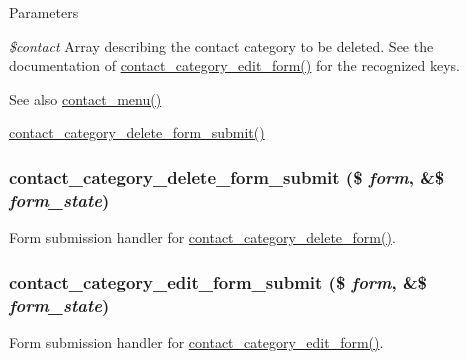 \begin{DoxyParams}{Parameters}
\item[{\em \$contact}]Array describing the contact category to be deleted. See the documentation of \hyperlink{group__forms_ga9283549b12df4a9a6cdb49202ae658ac}{contact\_\-category\_\-edit\_\-form()} for the recognized keys.\end{DoxyParams}
\begin{DoxySeeAlso}{See also}
\hyperlink{contact_8module_aa553b7cf1c3901cce1c2a8c4a04c5212}{contact\_\-menu()} 

\hyperlink{contact_8admin_8inc_a970b9c33770826b0f0229ffc42c0e277}{contact\_\-category\_\-delete\_\-form\_\-submit()} 
\end{DoxySeeAlso}
\hypertarget{contact_8admin_8inc_a970b9c33770826b0f0229ffc42c0e277}{
\subsubsection[{contact\_\-category\_\-delete\_\-form\_\-submit}]{\setlength{\rightskip}{0pt plus 5cm}contact\_\-category\_\-delete\_\-form\_\-submit (\$ {\em form}, \/  \&\$ {\em form\_\-state})}}
\label{contact_8admin_8inc_a970b9c33770826b0f0229ffc42c0e277}
Form submission handler for \hyperlink{contact_8admin_8inc_a33918ea271cb307b297673f8ea1eaf58}{contact\_\-category\_\-delete\_\-form()}. \hypertarget{contact_8admin_8inc_a3bd710e3ce90722af2a776e664a0f813}{
\subsubsection[{contact\_\-category\_\-edit\_\-form\_\-submit}]{\setlength{\rightskip}{0pt plus 5cm}contact\_\-category\_\-edit\_\-form\_\-submit (\$ {\em form}, \/  \&\$ {\em form\_\-state})}}
\label{contact_8admin_8inc_a3bd710e3ce90722af2a776e664a0f813}
Form submission handler for \hyperlink{group__forms_ga9283549b12df4a9a6cdb49202ae658ac}{contact\_\-category\_\-edit\_\-form()}.

